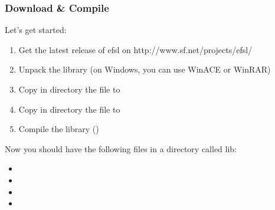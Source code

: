 \subsubsection{Download \& Compile}
Let's get started:
\begin{enumerate}
	\item{Get the latest release of efsl on http://www.sf.net/projects/efsl/}
	\item{Unpack the library (on Windows, you can use WinACE or WinRAR)}
	\item{Copy in directory  the file
		 to }
	\item{Copy in directory  the file
		 to }
	\item{Compile the library ()}
\end{enumerate}
Now you should have the following files in a directory called {lib}:
\begin{itemize}
	\item{}
	\item{}
	\item{}
	\item{}
\end{itemize}
